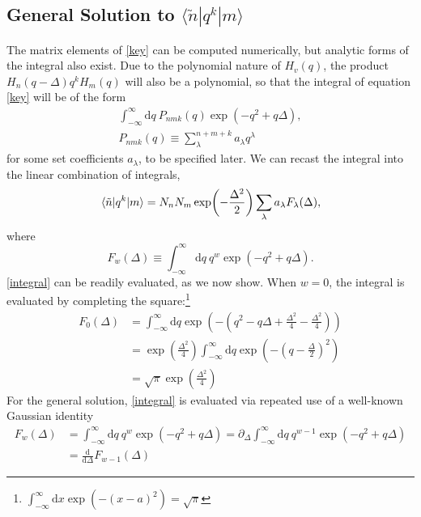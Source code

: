 \documentclass[aip, jcp, reprint, onecolumn, nofootinbib]{revtex4-2}
\begin{document}
\subsection{General Solution to $\langle \tilde{n} | q^k | m \rangle$}
The matrix elements of \autoref{key} can be computed numerically, but analytic forms of the integral also exist. 
Due to the polynomial nature of $H_v(q)$, the product $H_n(q-\Delta) q^k H_m(q)$ will also be a polynomial, so that the integral of equation \autoref{key} will be of the form
\begin{eqnarray}
	\int_{-\infty}^\infty \mathrm{d}q \ P_{nmk}(q) \exp(-q^2 + q\Delta), \\
	P_{nmk}(q) \equiv \sum_\lambda^{n+m+k} a_\lambda q^\lambda
\end{eqnarray}
for some set coefficients $a_\lambda$, to be specified later. We can recast the integral into the linear combination of integrals,
\begin{equation}\label{eq:analytic_form}
	\mel{\tilde{n}}{q^k}{m} = N_n N_m \exp(-\frac{\Delta^2}{2}) \sum_\lambda a_\lambda F_\lambda(\Delta),
\end{equation}
where
\begin{equation}\label{integral}
	F_w(\Delta) \equiv \int_{-\infty}^\infty \mathrm{d}q \ q^w \exp(-q^2 + q\Delta).
\end{equation}
\autoref{integral} can be readily evaluated, as we now show.  When $w=0$, the integral is evaluated by completing the square:\footnote{$\int_{-\infty}^{\infty} \mathrm{d}x \exp(-(x-a)^2) = \sqrt{\pi}$}
\begin{equation}
	\begin{split}
		F_0(\Delta) &= \int_{-\infty}^\infty \mathrm{d}q \exp(-(q^2 - q\Delta +\frac{\Delta^2}{4} - \frac{\Delta^2}{4}))\\
		&= \exp(\frac{\Delta^2}{4}) \int_{-\infty}^\infty \mathrm{d}q \exp(-(q - \frac{\Delta}{2})^2) \\
		&= \sqrt{\pi} \exp(\frac{\Delta^2}{4})
	\end{split}
\end{equation}
For the general solution, \autoref{integral} is evaluated via repeated use of a well-known Gaussian identity
\begin{equation}\label{identity}
	\begin{split}
		F_w(\Delta) &= \int_{-\infty}^\infty \mathrm{d}q \ q^w \exp(-q^2 + q\Delta) = \partial_{\Delta} \int_{-\infty}^\infty \mathrm{d}q \ q^{w-1} \exp(-q^2 + q\Delta) \\
		&= \frac{\mathrm{d}}{\mathrm{d}\Delta} F_{w-1}(\Delta)
	\end{split}
\end{equation}
\end{document}
